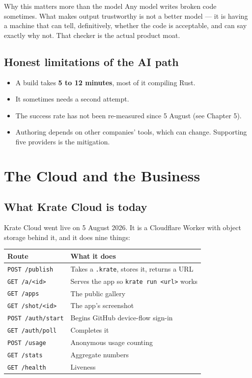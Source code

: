 \documentclass[11pt,a4paper]{report}
\begin{document}
\begin{plainbox}{Why this matters more than the model}
Any model writes broken code sometimes. What makes output trustworthy is
not a better model --- it is having a machine that can tell, definitively,
whether the code is acceptable, and can say exactly why not. That checker
is the actual product moat.
\end{plainbox}

\section{Honest limitations of the AI path}

\begin{itemize}[leftmargin=*]
  \item A build takes \textbf{5 to 12 minutes}, most of it compiling Rust.
  \item It sometimes needs a second attempt.
  \item The success rate has not been re-measured since 5 August (see
    Chapter 5).
  \item Authoring depends on other companies' tools, which can change.
    Supporting five providers is the mitigation.
\end{itemize}

\chapter{The Cloud and the Business}

\section{What Krate Cloud is today}

Krate Cloud went live on 5 August 2026. It is a Cloudflare Worker with
object storage behind it, and it does nine things:

\begin{center}
\begin{tabular}{lp{7.8cm}}
\toprule
\textbf{Route} & \textbf{What it does} \\
\midrule
\texttt{POST /publish} & Takes a \texttt{.krate}, stores it, returns a URL \\
\texttt{GET /a/<id>} & Serves the app so \texttt{krate run <url>} works \\
\texttt{GET /apps} & The public gallery \\
\texttt{GET /shot/<id>} & The app's screenshot \\
\texttt{POST /auth/start} & Begins GitHub device-flow sign-in \\
\texttt{GET /auth/poll} & Completes it \\
\texttt{POST /usage} & Anonymous usage counting \\
\texttt{GET /stats} & Aggregate numbers \\
\texttt{GET /health} & Liveness \\
\bottomrule
\end{tabular}
\end{center}
\end{document}
